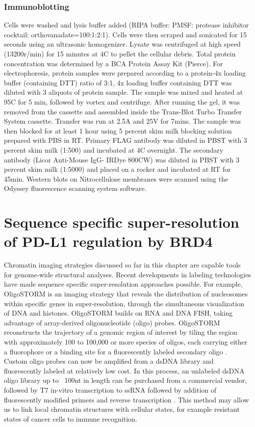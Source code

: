 \subsubsection{Immunoblotting}
Cells were washed and lysis buffer added (RIPA buffer: PMSF: protease inhibitor cocktail: orthovanadate=100:1:2:1). Cells were then scraped and sonicated for 15 seconds using an ultrasonic homogenizer. Lysate was centrifuged at high speed (13200r/min) for 15 minutes at 4C to pellet the cellular debris. Total protein concentration was determined by a BCA Protein Assay Kit (Pierce). For electrophoresis, protein samples were prepared according to a protein-4x loading buffer (containing DTT) ratio of 3:1, 4x loading buffer containing DTT was diluted with 3 aliquots of protein sample. The sample was mixed and heated at 95C for 5 min, followed by vortex and centrifuge. After running the gel, it was removed from the cassette and assembled inside the Trans-Blot Turbo Transfer System cassette. Transfer was run at 2.5A and 25V for 7mins. The sample was then blocked for at least 1 hour using 5 percent skim milk blocking solution prepared with PBS in RT. Primary FLAG antibody was diluted in PBST with 3 percent skim milk (1:500) and incubated at 4C overnight. The secondary antibody (Licor Anti-Mouse IgG- IRDye 800CW) was diluted in PBST with 3 percent skim milk (1:5000) and placed on a rocker and incubated at RT for 45min. Western blots on Nitrocellulose membranes were scanned using the Odyssey fluorescence scanning system software.

\section{Sequence specific super-resolution of PD-L1 regulation by BRD4}

Chromatin imaging strategies discussed so far in this chapter are capable tools for genome-wide structural analyses. Recent developments in labeling technologies have made sequence specific super-resolution approaches possible. For example, OligoSTORM \parencite{Beliveau2017} is an imaging strategy that reveals the distribution of nucleosomes within specific genes in super-resolution, through the simultaneous visualization of DNA and histones. OligoSTORM builds on RNA and DNA FISH, taking advantage of array-derived oligonucleotide (oligo) probes. OligoSTORM reconstructs the trajectory of a genomic region of interest by tiling the region with approximately 100 to 100,000 or more species of oligos, each carrying either a fluorophore or a binding site for a fluorescently labeled secondary oligo \parencite{Boettiger2016, Beliveau2017}. Custom oligo probes can now be amplified from a dsDNA library and fluorescently labeled at relatively low cost. In this process, an unlabeled dsDNA oligo library up to ~100nt in length can be purchased from a commercial vendor, followed by T7 in-vitro transcription to ssRNA followed by addition of fluorescently modified primers and reverse transcription \parencite{Murgha2015,Boettiger2020}. This method may allow us to link local chromatin structures with cellular states, for example resistant states of cancer cells to immune recognition.

